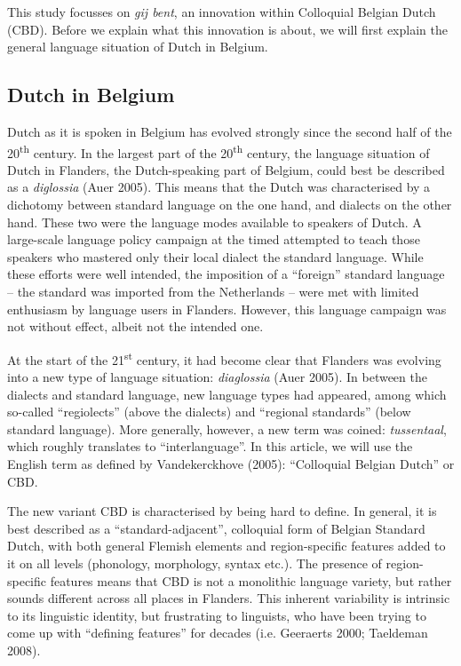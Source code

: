\documentclass[
  letterpaper,
  DIV=11,
  numbers=noendperiod,
  oneside]{scrartcl}
\begin{document}
This study focusses on \emph{gij bent}, an innovation within Colloquial
Belgian Dutch (CBD). Before we explain what this innovation is about, we
will first explain the general language situation of Dutch in Belgium.

\subsection{Dutch in Belgium}\label{dutch-in-belgium}

Dutch as it is spoken in Belgium has evolved strongly since the second
half of the 20\textsuperscript{th} century. In the largest part of the
20\textsuperscript{th} century, the language situation of Dutch in
Flanders, the Dutch-speaking part of Belgium, could best be described as
a \emph{diglossia} (Auer 2005). This means that the Dutch was
characterised by a dichotomy between standard language on the one hand,
and dialects on the other hand. These two were the language modes
available to speakers of Dutch. A large-scale language policy campaign
at the timed attempted to teach those speakers who mastered only their
local dialect the standard language. While these efforts were well
intended, the imposition of a ``foreign'' standard language -- the
standard was imported from the Netherlands -- were met with limited
enthusiasm by language users in Flanders. However, this language
campaign was not without effect, albeit not the intended one.

At the start of the 21\textsuperscript{st} century, it had become clear
that Flanders was evolving into a new type of language situation:
\emph{diaglossia} (Auer 2005). In between the dialects and standard
language, new language types had appeared, among which so-called
``regiolects'' (above the dialects) and ``regional standards'' (below
standard language). More generally, however, a new term was coined:
\emph{tussentaal}, which roughly translates to ``interlanguage''. In
this article, we will use the English term as defined by Vandekerckhove
(2005): ``Colloquial Belgian Dutch'' or CBD.

The new variant CBD is characterised by being hard to define. In
general, it is best described as a ``standard-adjacent'', colloquial
form of Belgian Standard Dutch, with both general Flemish elements and
region-specific features added to it on all levels (phonology,
morphology, syntax etc.). The presence of region-specific features means
that CBD is not a monolithic language variety, but rather sounds
different across all places in Flanders. This inherent variability is
intrinsic to its linguistic identity, but frustrating to linguists, who
have been trying to come up with ``defining features'' for decades (i.e.
Geeraerts 2000; Taeldeman 2008).
\end{document}
